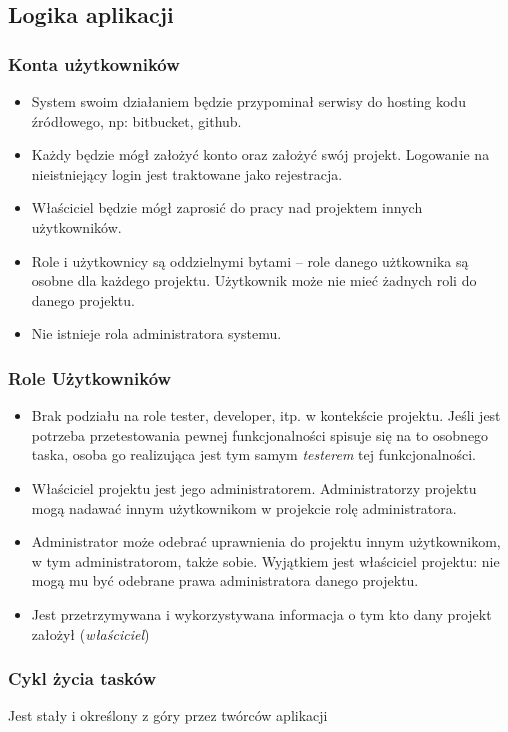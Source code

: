\documentclass[a4paper,12pt,notitlepage]{mwrep}
\begin{document}
\subsection{Logika aplikacji}
\subsubsection{Konta użytkowników}
\begin{itemize}
	\item	System swoim działaniem będzie przypominał serwisy do hosting kodu źródłowego, np: bitbucket, github.
	\item	Każdy będzie mógł założyć konto oraz założyć swój projekt.
			Logowanie na nieistniejący login jest traktowane jako rejestracja.
	\item	Właściciel będzie mógł zaprosić do pracy nad projektem innych użytkowników.
	\item	Role i użytkownicy są oddzielnymi bytami -- role danego użtkownika są osobne dla każdego projektu.
			Użytkownik może nie mieć żadnych roli do danego projektu.
	\item	Nie istnieje rola administratora systemu.
\end{itemize}

\subsubsection{Role Użytkowników}
\begin{itemize}
	\item	Brak podziału na role tester, developer, itp. w kontekście projektu.
			Jeśli jest potrzeba przetestowania pewnej funkcjonalności spisuje się na to osobnego taska,
			osoba go realizująca jest tym samym \emph{testerem} tej funkcjonalności.
	\item	Właściciel projektu jest jego administratorem. Administratorzy projektu mogą nadawać innym
			użytkownikom w projekcie rolę administratora.
	\item	Administrator może odebrać uprawnienia do projektu innym użytkownikom, w tym administratorom,
			także sobie. Wyjątkiem jest właściciel projektu: nie mogą mu być odebrane prawa administratora danego projektu.
	\item	Jest przetrzymywana i wykorzystywana informacja o tym kto dany projekt założył (\emph{właściciel})
\end{itemize}

\subsubsection{Cykl życia tasków}
Jest stały i określony z góry przez twórców aplikacji
\end{document}
